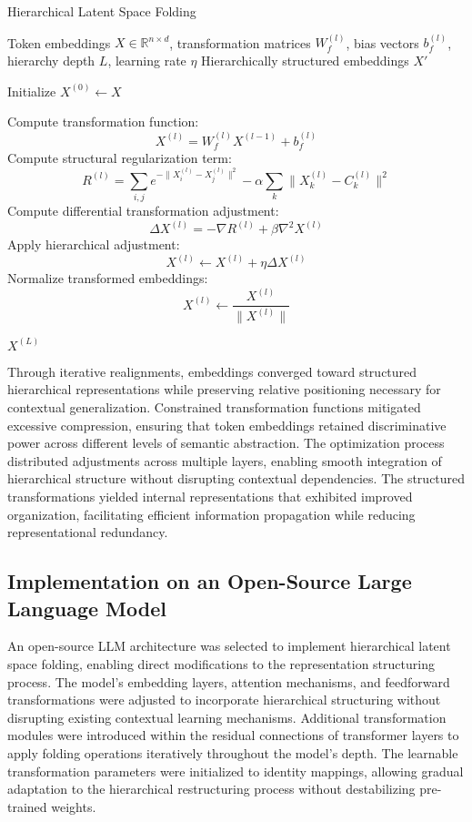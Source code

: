 \documentclass[5p,times]{elsarticle}
\begin{document}
\begin{algorithm}[t]
	\caption{Hierarchical Latent Space Folding}
	\label{alg:hlf}
	\begin{algorithmic}[1]
		\Require Token embeddings \(X \in \mathbb{R}^{n \times d}\), transformation matrices \(W_f^{(l)}\), bias vectors \(b_f^{(l)}\), hierarchy depth \(L\), learning rate \(\eta\)
		\Ensure Hierarchically structured embeddings \(X'\)
		
		\State Initialize \(X^{(0)} \gets X\)
		
		\State Compute transformation function: 
		\[
		X^{(l)} = W_f^{(l)} X^{(l-1)} + b_f^{(l)}
		\]
		\State Compute structural regularization term:
		\[
		R^{(l)} = \sum_{i,j} e^{-\|X_i^{(l)} - X_j^{(l)}\|^2} - \alpha \sum_{k} \|X_k^{(l)} - C_k^{(l)}\|^2
		\]
		\State Compute differential transformation adjustment:
		\[
		\Delta X^{(l)} = -\nabla R^{(l)} + \beta \nabla^2 X^{(l)}
		\]
		\State Apply hierarchical adjustment:
		\[
		X^{(l)} \gets X^{(l)} + \eta \Delta X^{(l)}
		\]
		\State Normalize transformed embeddings:
		\[
		X^{(l)} \gets \frac{X^{(l)}}{\|X^{(l)}\|}
		\]
		\EndFor
		
		\State \Return \(X^{(L)}\)
	\end{algorithmic}
\end{algorithm}

Through iterative realignments, embeddings converged toward structured hierarchical representations while preserving relative positioning necessary for contextual generalization. Constrained transformation functions mitigated excessive compression, ensuring that token embeddings retained discriminative power across different levels of semantic abstraction. The optimization process distributed adjustments across multiple layers, enabling smooth integration of hierarchical structure without disrupting contextual dependencies. The structured transformations yielded internal representations that exhibited improved organization, facilitating efficient information propagation while reducing representational redundancy.

\subsection{Implementation on an Open-Source Large Language Model}

An open-source LLM architecture was selected to implement hierarchical latent space folding, enabling direct modifications to the representation structuring process. The model’s embedding layers, attention mechanisms, and feedforward transformations were adjusted to incorporate hierarchical structuring without disrupting existing contextual learning mechanisms. Additional transformation modules were introduced within the residual connections of transformer layers to apply folding operations iteratively throughout the model’s depth. The learnable transformation parameters were initialized to identity mappings, allowing gradual adaptation to the hierarchical restructuring process without destabilizing pre-trained weights.
\end{document}
